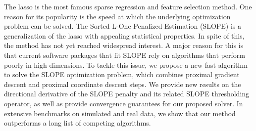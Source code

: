The lasso is the most famous sparse regression and feature selection method. %
One reason for its popularity is the speed at which the underlying optimization problem can be solved. %
The Sorted L-One Penalized Estimation (SLOPE) is a generalization of the lasso with appealing statistical properties. 
In spite of this, the method has not yet reached widespread interest.
A major reason for this is that current software packages that fit SLOPE rely on algorithms that perform poorly in high dimensions. %
To tackle this issue, we propose a new fast algorithm to solve the SLOPE optimization problem,
which combines proximal gradient descent and proximal coordinate descent steps.
We provide new results on the directional derivative of the SLOPE penalty and its related SLOPE thresholding operator, as well as provide convergence guarantees for our proposed solver.
In extensive benchmarks on simulated and real data, we show that our method outperforms a long list of competing algorithms.
